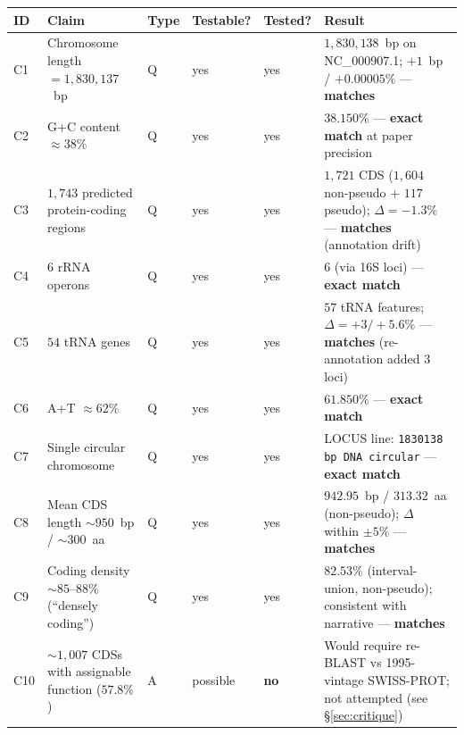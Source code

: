 \documentclass[10pt]{article}
\begin{document}
{\footnotesize
\begin{longtable}{@{}p{}p{}p{}p{}p{}p{}@{}}
\toprule
\textbf{ID} & \textbf{Claim} & \textbf{Type} & \textbf{Testable?} & \textbf{Tested?} & \textbf{Result} \\
\midrule
\endfirsthead
C1  & Chromosome length $= 1{,}830{,}137$~bp                            & Q & yes            & yes     & $1{,}830{,}138$~bp on NC\_000907.1; $+1$~bp / $+0.00005\%$ --- \textbf{matches} \\
C2  & G+C content $\approx 38\%$                                        & Q & yes            & yes     & $38.150\%$ --- \textbf{exact match} at paper precision \\
C3  & $1{,}743$ predicted protein-coding regions                        & Q & yes            & yes     & $1{,}721$ CDS ($1{,}604$ non-pseudo + $117$ pseudo); $\Delta = -1.3\%$ --- \textbf{matches} (annotation drift) \\
C4  & $6$ rRNA operons                                                  & Q & yes            & yes     & $6$ (via 16S loci) --- \textbf{exact match} \\
C5  & $54$ tRNA genes                                                   & Q & yes            & yes     & $57$ tRNA features; $\Delta = +3 / +5.6\%$ --- \textbf{matches} (re-annotation added 3 loci) \\
C6  & A+T $\approx 62\%$                                                & Q & yes            & yes     & $61.850\%$ --- \textbf{exact match} \\
C7  & Single circular chromosome                                        & Q & yes            & yes     & LOCUS line: \texttt{1830138 bp DNA circular} --- \textbf{exact match} \\
C8  & Mean CDS length $\sim 950$~bp / $\sim 300$~aa                     & Q & yes            & yes     & $942.95$~bp / $313.32$~aa (non-pseudo); $\Delta$ within $\pm 5\%$ --- \textbf{matches} \\
C9  & Coding density $\sim 85$--$88\%$ (``densely coding'')             & Q & yes            & yes     & $82.53\%$ (interval-union, non-pseudo); consistent with narrative --- \textbf{matches} \\
C10 & $\sim 1{,}007$ CDSs with assignable function ($57.8\%$)           & A & possible       & \textbf{no}  & Would require re-BLAST vs 1995-vintage SWISS-PROT; not attempted (see \S\ref{sec:critique}) \\

\end{longtable}}
\end{document}
